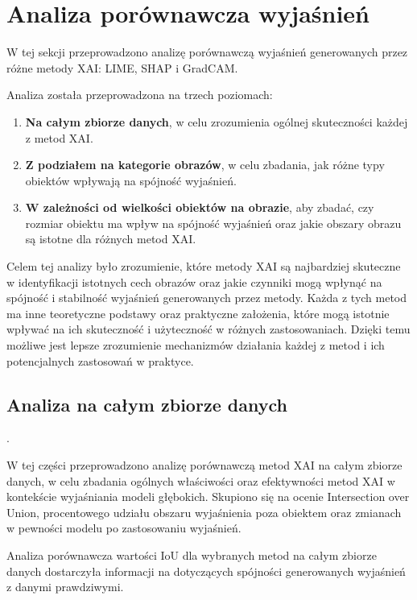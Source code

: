 \section*{Analiza porównawcza wyjaśnień}
W tej sekcji przeprowadzono analizę porównawczą wyjaśnień generowanych przez różne metody XAI: LIME, SHAP i GradCAM.

Analiza została przeprowadzona na trzech poziomach:
\begin{enumerate}
	\item \textbf{Na całym zbiorze danych}, w celu zrozumienia ogólnej skuteczności każdej z metod XAI.
	\item \textbf{Z podziałem na kategorie obrazów}, w celu zbadania, jak różne typy obiektów wpływają na spójność wyjaśnień.
	\item \textbf{W zależności od wielkości obiektów na obrazie}, aby zbadać, czy rozmiar obiektu ma wpływ na spójność wyjaśnień oraz jakie obszary obrazu są istotne dla różnych metod XAI.
\end{enumerate}

Celem tej analizy było zrozumienie, które metody XAI są najbardziej skuteczne w identyfikacji istotnych cech obrazów oraz jakie czynniki mogą wpłynąć na spójność i stabilność wyjaśnień generowanych przez metody.
Każda z tych metod ma inne teoretyczne podstawy oraz praktyczne założenia, które mogą istotnie wpływać na ich skuteczność i użyteczność w różnych zastosowaniach.
Dzięki temu możliwe jest lepsze zrozumienie mechanizmów działania każdej z metod i ich potencjalnych zastosowań w praktyce.

\subsection*{Analiza na całym zbiorze danych}.

W tej części przeprowadzono analizę porównawczą metod XAI na całym zbiorze danych, w celu zbadania ogólnych właściwości oraz efektywności metod XAI w kontekście wyjaśniania modeli głębokich.
Skupiono się na ocenie Intersection over Union, procentowego udziału obszaru wyjaśnienia poza obiektem oraz zmianach w pewności modelu po zastosowaniu wyjaśnień.

\vspace{1cm}

Analiza porównawcza wartości IoU dla wybranych metod na całym zbiorze danych dostarczyła informacji na dotyczących spójności generowanych wyjaśnień z danymi prawdziwymi.

